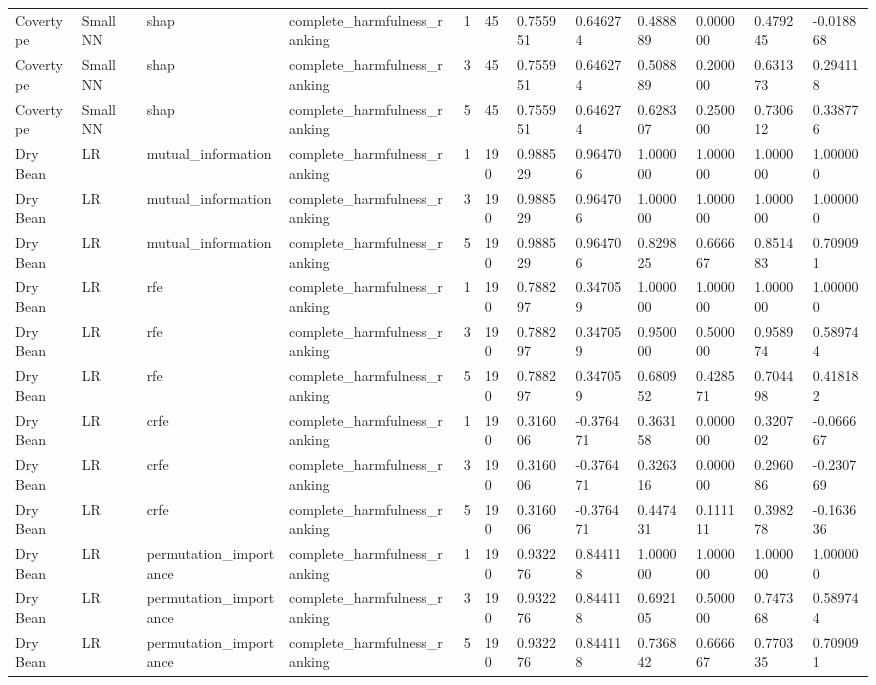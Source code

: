 \begin{table}[t]
\begin{tabular}{llllllllllll}
Covertype & Small NN & shap & complete\_harmfulness\_ranking & 1 & 45 & 0.755951 & 0.646274 & 0.488889 & 0.000000 & 0.479245 & -0.018868 \\
Covertype & Small NN & shap & complete\_harmfulness\_ranking & 3 & 45 & 0.755951 & 0.646274 & 0.508889 & 0.200000 & 0.631373 & 0.294118 \\
Covertype & Small NN & shap & complete\_harmfulness\_ranking & 5 & 45 & 0.755951 & 0.646274 & 0.628307 & 0.250000 & 0.730612 & 0.338776 \\
Dry Bean & LR & mutual\_information & complete\_harmfulness\_ranking & 1 & 190 & 0.988529 & 0.964706 & 1.000000 & 1.000000 & 1.000000 & 1.000000 \\
Dry Bean & LR & mutual\_information & complete\_harmfulness\_ranking & 3 & 190 & 0.988529 & 0.964706 & 1.000000 & 1.000000 & 1.000000 & 1.000000 \\
Dry Bean & LR & mutual\_information & complete\_harmfulness\_ranking & 5 & 190 & 0.988529 & 0.964706 & 0.829825 & 0.666667 & 0.851483 & 0.709091 \\
Dry Bean & LR & rfe & complete\_harmfulness\_ranking & 1 & 190 & 0.788297 & 0.347059 & 1.000000 & 1.000000 & 1.000000 & 1.000000 \\
Dry Bean & LR & rfe & complete\_harmfulness\_ranking & 3 & 190 & 0.788297 & 0.347059 & 0.950000 & 0.500000 & 0.958974 & 0.589744 \\
Dry Bean & LR & rfe & complete\_harmfulness\_ranking & 5 & 190 & 0.788297 & 0.347059 & 0.680952 & 0.428571 & 0.704498 & 0.418182 \\
Dry Bean & LR & crfe & complete\_harmfulness\_ranking & 1 & 190 & 0.316006 & -0.376471 & 0.363158 & 0.000000 & 0.320702 & -0.066667 \\
Dry Bean & LR & crfe & complete\_harmfulness\_ranking & 3 & 190 & 0.316006 & -0.376471 & 0.326316 & 0.000000 & 0.296086 & -0.230769 \\
Dry Bean & LR & crfe & complete\_harmfulness\_ranking & 5 & 190 & 0.316006 & -0.376471 & 0.447431 & 0.111111 & 0.398278 & -0.163636 \\
Dry Bean & LR & permutation\_importance & complete\_harmfulness\_ranking & 1 & 190 & 0.932276 & 0.844118 & 1.000000 & 1.000000 & 1.000000 & 1.000000 \\
Dry Bean & LR & permutation\_importance & complete\_harmfulness\_ranking & 3 & 190 & 0.932276 & 0.844118 & 0.692105 & 0.500000 & 0.747368 & 0.589744 \\
Dry Bean & LR & permutation\_importance & complete\_harmfulness\_ranking & 5 & 190 & 0.932276 & 0.844118 & 0.736842 & 0.666667 & 0.770335 & 0.709091 \\

\end{tabular}
\end{table}
